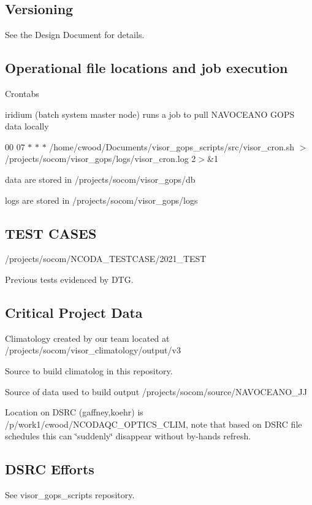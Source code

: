 \subsection*{Versioning}

See the Design Document for details.

\subsection*{Operational file locations and job execution}


\begin{DoxyItemize}
\item Crontabs
\begin{DoxyItemize}
\item iridium (batch system master node) runs a job to pull N\-A\-V\-O\-C\-E\-A\-N\-O G\-O\-P\-S data locally
\item 00 07 $\ast$ $\ast$ $\ast$ /home/cwood/\-Documents/visor\-\_\-gops\-\_\-scripts/src/visor\-\_\-cron.sh $>$ /projects/socom/visor\-\_\-gops/logs/visor\-\_\-cron.log 2$>$\&1
\item data are stored in {\ttfamily /projects/socom/visor\-\_\-gops/db}
\item logs are stored in {\ttfamily /projects/socom/visor\-\_\-gops/logs}
\end{DoxyItemize}
\end{DoxyItemize}

\subsection*{T\-E\-S\-T C\-A\-S\-E\-S}


\begin{DoxyItemize}
\item {\ttfamily /projects/socom/\-N\-C\-O\-D\-A\-\_\-\-T\-E\-S\-T\-C\-A\-S\-E/2021\-\_\-\-T\-E\-S\-T}
\item Previous tests evidenced by D\-T\-G.
\end{DoxyItemize}

\subsection*{Critical Project Data}


\begin{DoxyItemize}
\item Climatology created by our team located at {\ttfamily /projects/socom/visor\-\_\-climatology/output/v3}
\item Source to build climatolog in this repository.
\item Source of data used to build output {\ttfamily /projects/socom/source/\-N\-A\-V\-O\-C\-E\-A\-N\-O\-\_\-\-J\-J}
\item Location on D\-S\-R\-C (gaffney,koehr) is {\ttfamily /p/work1/cwood/\-N\-C\-O\-D\-A\-Q\-C\-\_\-\-O\-P\-T\-I\-C\-S\-\_\-\-C\-L\-I\-M}, note that based on D\-S\-R\-C file schedules this can \char`\"{}suddenly\char`\"{} disappear without by-\/hands refresh.
\end{DoxyItemize}

\subsection*{D\-S\-R\-C Efforts}

See visor\-\_\-gops\-\_\-scripts repository. 